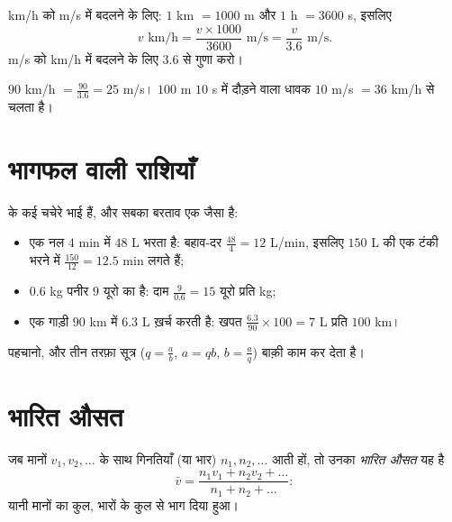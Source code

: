 \begin{method}[चाल के मात्रक बदलना]\label{met:g8:speed:convert}
km/h को m/s में बदलने के लिए: $1$ km $= 1000$ m और $1$ h $= 3600$ s,
इसलिए
\[
v \text{ km/h} = \frac{v \times 1000}{3600} \text{ m/s}
= \frac{v}{3.6} \text{ m/s}.
\]
m/s को km/h में बदलने के लिए $3.6$ से गुणा करो।
\end{method}

\begin{example}\label{ex:g8:speed:convert}
$90$ km/h $= \frac{90}{3.6} = 25$ m/s। $100$ m $10$ s में दौड़ने
वाला धावक $10$ m/s $= 36$ km/h से चलता है।
\end{example}

\section{भागफल वाली राशियाँ}

\begin{example}[बहाव, घनत्व, प्रति किलो दाम]\label{ex:g8:speed:quotients}
 के कई चचेरे भाई हैं, और सबका बरताव एक जैसा है:
\begin{itemize}
  \item एक नल $4$ min में $48$ L भरता है: बहाव-दर
        $\frac{48}{4} = 12$ L/min, इसलिए $150$ L की एक टंकी भरने
        में $\frac{150}{12} = 12.5$ min लगते हैं;
  \item $0.6$ kg पनीर $9$ यूरो का है: दाम
        $\frac{9}{0.6} = 15$ यूरो प्रति kg;
  \item एक गाड़ी $90$ km में $6.3$ L ख़र्च करती है: खपत
        $\frac{6.3}{90} \times 100 = 7$ L प्रति $100$ km।
\end{itemize}
 पहचानो, और तीन तरफ़ा सूत्र ($q = \frac ab$, $a = qb$,
$b = \frac aq$) बाक़ी काम कर देता है।
\end{example}

\section{भारित औसत}

\begin{definition}[भारित औसत]\label{def:g8:speed:average}
जब मानों $v_1, v_2, \dots$ के साथ गिनतियाँ (या भार)
$n_1, n_2, \dots$ आती हों, तो उनका \emph{भारित औसत}
यह है
\[
\bar v = \frac{n_1 v_1 + n_2 v_2 + \dots}{n_1 + n_2 + \dots} :
\]
यानी मानों का कुल, भारों के कुल से भाग दिया हुआ।
\end{definition}


